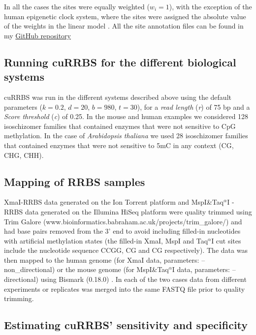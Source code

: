In all the cases the sites were equally weighted ($w_i = 1$), with the exception of the human epigenetic clock system, where the sites were assigned the absolute value of the weights in the linear model \citep{Horvath2013}. All the site annotation files can be found in my \href{https://github.com/demh/cuRRBS/tree/master/examples}{GitHub repository} \citep{Martin-Herranz2017}


\subsection*{Running cuRRBS for the different biological systems}

cuRRBS was run in the different systems described above using the default parameters ($k = 0.2$, $d = 20$, $b = 980$, $t = 30$), for a \textit{read length} (\textit{r}) of 75 bp and a \textit{Score threshold} (\textit{c}) of 0.25. In the mouse and human examples we considered 128 isoschizomer families that contained enzymes that were not sensitive to CpG methylation. In the case of \textit{Arabidopsis thaliana} we used 28 isoschizomer families that contained enzymes that were not sensitive to 5mC in any context (\acrshort{CG}, CHG, CHH).


\subsection*{Mapping of RRBS samples}

XmaI-RRBS data generated on the Ion Torrent platform \citep{Tanas2017} and MspI\&Taq$^\alpha$I -RRBS data generated on the Illumina HiSeq platform \citep{Lim2016} were quality trimmed using Trim Galore (www.bioinformatics.babraham.ac.uk/projects/trim\_galore/) and had base pairs removed from the 3' end to avoid including filled-in nucleotides with artificial methylation states (the filled-in XmaI, MspI and Taq$^\alpha$I cut sites include the nucleotide sequence CCGG, CG and CG respectively). The data was then mapped to the human genome (for XmaI data, parameters: --non\_directional) or the mouse genome (for MspI\&Taq$^\alpha$I  data, parameters: --directional) using Bismark (0.18.0) \citep{Krueger2011}. In each of the two cases data from different experiments or replicates was merged into the same FASTQ file prior to quality trimming.

\subsection*{Estimating cuRRBS' sensitivity and specificity }

